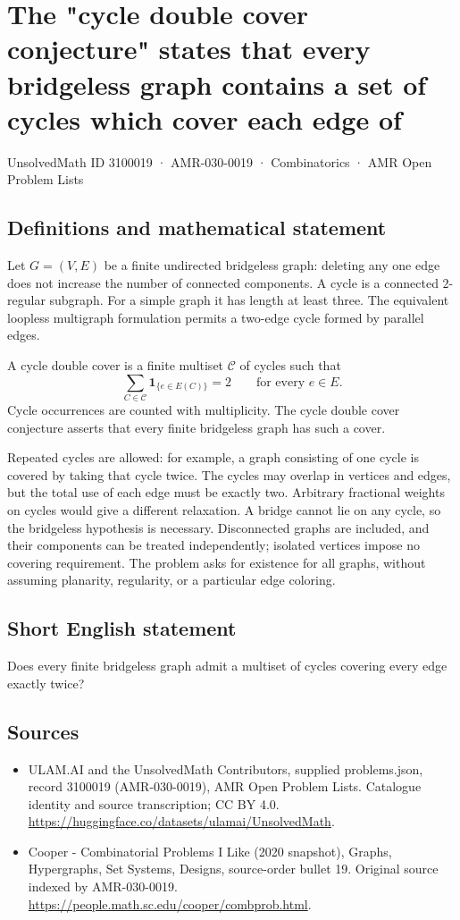 \documentclass[11pt,a4paper]{article}
\begin{document}
\section*{The "cycle double cover conjecture" states that every bridgeless graph contains a set of cycles which cover each edge of}\label{3100019}
{\small UnsolvedMath ID 3100019 · AMR-030-0019 · Combinatorics · AMR Open Problem Lists}
\subsection{Definitions and mathematical statement}
Let $G=(V,E)$ be a finite undirected bridgeless graph: deleting any
one edge does not increase the number of connected components.
A cycle is a connected $2$-regular subgraph. For a simple graph
it has length at least three. The equivalent loopless multigraph
formulation permits a two-edge cycle formed by parallel edges.

A cycle double cover is a finite multiset $\mathcal C$ of cycles
such that
\[
            \sum_{C\in\mathcal C}\mathbf 1_{\{e\in E(C)\}}=2
                       \qquad\text{for every }e\in E.
\]
Cycle occurrences are counted with multiplicity. The cycle double
cover conjecture asserts that every finite bridgeless graph has
such a cover.

Repeated cycles are allowed: for example, a graph consisting of
one cycle is covered by taking that cycle twice. The cycles may
overlap in vertices and edges, but the total use of each edge must
be exactly two. Arbitrary fractional weights on cycles would give
a different relaxation. A bridge cannot lie on any cycle, so the
bridgeless hypothesis is necessary. Disconnected graphs are
included, and their components can be treated independently;
isolated vertices impose no covering requirement. The problem
asks for existence for all graphs, without assuming planarity,
regularity, or a particular edge coloring.
\subsection{Short English statement}
Does every finite bridgeless graph admit a multiset of cycles covering every edge exactly twice?
\subsection{Sources}
\begin{itemize}
\item[S1] ULAM.AI and the UnsolvedMath Contributors, supplied problems.json, record 3100019 (AMR-030-0019), AMR Open Problem Lists. Catalogue identity and source transcription; CC BY 4.0.
\url{https://huggingface.co/datasets/ulamai/UnsolvedMath}.
\item[S2] Cooper - Combinatorial Problems I Like (2020 snapshot), Graphs, Hypergraphs, Set Systems, Designs, source-order bullet 19. Original source indexed by AMR-030-0019.
\url{https://people.math.sc.edu/cooper/combprob.html}.
\end{itemize}
\end{document}
